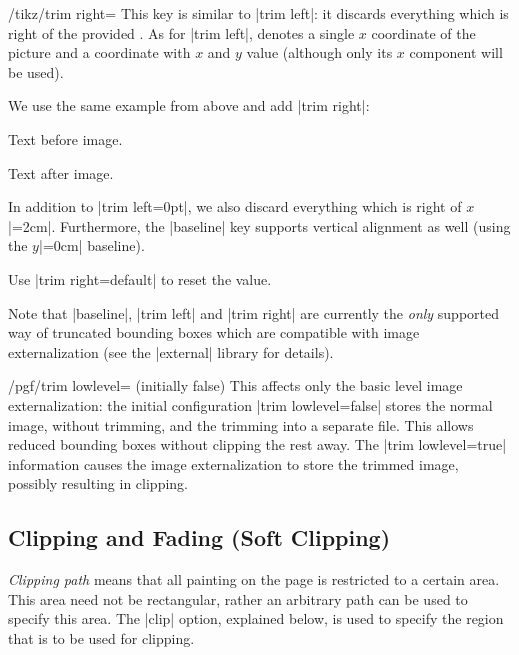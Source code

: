 \begin{key}{/tikz/trim right=}
    This key is similar to |trim left|: it discards everything which is right
    of the provided . As for |trim left|,
     denotes a single $x$ coordinate of the picture and
     a coordinate with $x$ and $y$ value (although only its
    $x$ component will be used).

    We use the same example from above and add |trim right|:
\begin{codeexample}[pre={\begin{lateximage}},post={\end{lateximage}}]
Text before image.%
Text after image.
\end{codeexample}
    In addition to |trim left=0pt|, we also discard everything which is right
    of $x$|=2cm|. Furthermore, the |baseline| key supports vertical alignment
    as well (using the $y$|=0cm| baseline).

    Use |trim right=default| to reset the value.
\end{key}

Note that |baseline|, |trim left| and |trim right| are currently the
\emph{only} supported way of truncated bounding boxes which are compatible with
image externalization (see the |external| library for details).

\begin{key}{/pgf/trim lowlevel= (initially false)}
    This affects only the basic level image externalization: the initial
    configuration |trim lowlevel=false| stores the normal image, without
    trimming, and the trimming into a separate file. This allows reduced
    bounding boxes without clipping the rest away. The |trim lowlevel=true|
    information causes the image externalization to store the trimmed image,
    possibly resulting in clipping.
\end{key}


\subsection{Clipping and Fading (Soft Clipping)}

\emph{Clipping path} means that all painting on the page is restricted to a
certain area. This area need not be rectangular, rather an arbitrary path can
be used to specify this area. The |clip| option, explained below, is used to
specify the region that is to be used for clipping.

